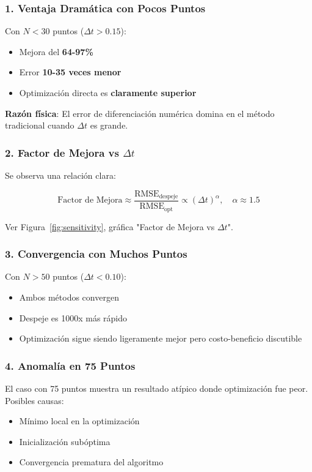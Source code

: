 \documentclass[11pt,a4paper]{article}
\begin{document}
\subsubsection{1. Ventaja Dramática con Pocos Puntos}

Con $N < 30$ puntos ($\Delta t > 0.15$):
\begin{itemize}
    \item Mejora del \textbf{64-97\%}
    \item Error \textbf{10-35 veces menor}
    \item Optimización directa es \textbf{claramente superior}
\end{itemize}

\textbf{Razón física}: El error de diferenciación numérica domina en el método tradicional cuando $\Delta t$ es grande.

\subsubsection{2. Factor de Mejora vs $\Delta t$}

Se observa una relación clara:

\begin{equation}
\text{Factor de Mejora} \approx \frac{\text{RMSE}_{\text{despeje}}}{\text{RMSE}_{\text{opt}}} \propto (\Delta t)^{\alpha}, \quad \alpha \approx 1.5
\end{equation}

Ver Figura~\ref{fig:sensitivity}, gráfica "Factor de Mejora vs $\Delta t$".

\subsubsection{3. Convergencia con Muchos Puntos}

Con $N > 50$ puntos ($\Delta t < 0.10$):
\begin{itemize}
    \item Ambos métodos convergen
    \item Despeje es 1000x más rápido
    \item Optimización sigue siendo ligeramente mejor pero costo-beneficio discutible
\end{itemize}

\subsubsection{4. Anomalía en 75 Puntos}

El caso con 75 puntos muestra un resultado atípico donde optimización fue peor. Posibles causas:
\begin{itemize}
    \item Mínimo local en la optimización
    \item Inicialización subóptima
    \item Convergencia prematura del algoritmo
\end{itemize}
\end{document}
